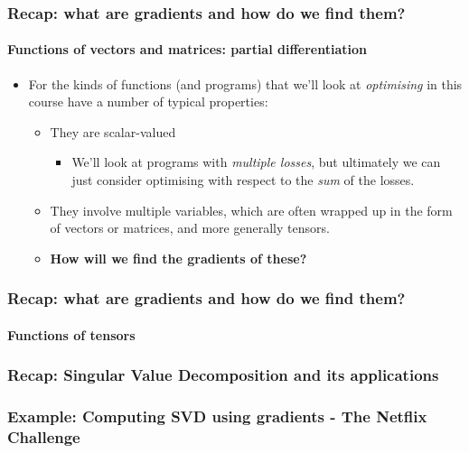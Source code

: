 \documentclass{beamer}
\begin{document}
\begin{frame}
\frametitle{Recap: what are gradients and how do we find them?}
\framesubtitle{Functions of vectors and matrices: partial differentiation}
\begin{itemize}
	\item<+-> For the kinds of functions (and programs) that we'll look at \emph{optimising} in this course have a number of typical properties:
	\begin{itemize}
		\item<+-> They are scalar-valued
		\begin{itemize}
			\item We'll look at programs with \emph{multiple losses}, but ultimately we can just consider optimising with respect to the \emph{sum} of the losses.
		\end{itemize}
		\item<+-> They involve multiple variables, which are often wrapped up in the form of vectors or matrices, and more generally tensors.
		\item<+-> \textbf{How will we find the gradients of these?}
	\end{itemize}
\end{itemize}
\end{frame}

\begin{frame}
\frametitle{Recap: what are gradients and how do we find them?}
\framesubtitle{Functions of tensors}

\end{frame}

\begin{frame}
\frametitle{Recap: Singular Value Decomposition and its applications}
	
\end{frame}

\begin{frame}
\frametitle{Example: Computing SVD using gradients - The Netflix Challenge}
	
\end{frame}
\end{document}
